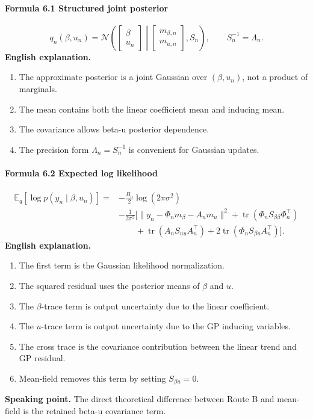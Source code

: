 \documentclass[12pt]{article}
\begin{document}
\paragraph{Formula 6.1 Structured joint posterior}
\[
q_n(\beta,u_n)
=
\mathcal N
\left(
\begin{bmatrix}\beta\\u_n\end{bmatrix}
\middle|
\begin{bmatrix}m_{\beta,n}\\m_{u,n}\end{bmatrix},
S_n
\right),
\qquad
S_n^{-1}=\Lambda_n.
\]
\textbf{English explanation.}
\begin{enumerate}[leftmargin=2em]
\item The approximate posterior is a joint Gaussian over \((\beta,u_n)\), not a product of marginals.
\item The mean contains both the linear coefficient mean and inducing mean.
\item The covariance allows beta-u posterior dependence.
\item The precision form \(\Lambda_n=S_n^{-1}\) is convenient for Gaussian updates.
\end{enumerate}

\paragraph{Formula 6.2 Expected log likelihood}
\[
\begin{aligned}
\mathbb E_q[\log p(y_n\mid\beta,u_n)]
=&-\frac{B_n}{2}\log(2\pi\sigma^2)\\
&-\frac{1}{2\sigma^2}
\Big[
\|y_n-\Phi_n m_\beta-A_n m_u\|^2
+\operatorname{tr}(\Phi_nS_{\beta\beta}\Phi_n^\top)\\
&\qquad
+\operatorname{tr}(A_nS_{uu}A_n^\top)
+2\operatorname{tr}(\Phi_nS_{\beta u}A_n^\top)
\Big].
\end{aligned}
\]
\textbf{English explanation.}
\begin{enumerate}[leftmargin=2em]
\item The first term is the Gaussian likelihood normalization.
\item The squared residual uses the posterior means of \(\beta\) and \(u\).
\item The \(\beta\)-trace term is output uncertainty due to the linear coefficient.
\item The \(u\)-trace term is output uncertainty due to the GP inducing variables.
\item The cross trace is the covariance contribution between the linear trend and GP residual.
\item Mean-field removes this term by setting \(S_{\beta u}=0\).
\end{enumerate}
\textbf{Speaking point.} The direct theoretical difference between Route B and mean-field is the retained beta-u covariance term.
\end{document}
